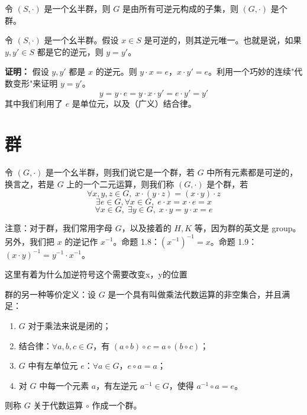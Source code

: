 \begin{lemma}[引理 1.1：幺半群的逆元构成群]
令 $(S,\cdot)$ 是一个幺半群，则 $G$ 是由所有可逆元构成的子集，则 $(G,\cdot)$ 是个群。
\end{lemma}

\begin{proposition}[命题 1.7：逆元唯一]
令 $(S,\cdot)$ 是一个幺半群。假设 $x\in S$ 是可逆的，则其逆元唯一。也就是说，如果 $y,y'\in S$ 都是它的逆元，则 $y=y'$。

\textbf{证明：} 假设 $y,y'$ 都是 $x$ 的逆元。则 $y\cdot x=e$，$x\cdot y'=e$。利用一个巧妙的连续"代数变形"来证明 $y=y'$。
\[
y=y\cdot e=y\cdot x\cdot y'=e\cdot y'=y'
\]
其中我们利用了 $e$ 是单位元，以及（广义）结合律。
\end{proposition}

\section{群}

\begin{definition}[群（定义 1.9）]
令 $(G,\cdot)$ 是一个幺半群，则我们说它是一个群，若 $G$ 中所有元素都是可逆的，换言之，若是 $G$ 上的一个二元运算，则我们称 $(G,\cdot)$ 是个群，若
\[
\forall x,y,z\in G,\;x\cdot(y\cdot z)=(x\cdot y)\cdot z
\]
\[
\exists e\in G,\forall x\in G,\;e\cdot x=x\cdot e=x
\]
\[
\forall x\in G,\;\exists y\in G,\;x\cdot y=y\cdot x=e
\]

注意：对于群，我们常用字母 $G$，以及接着的 $H,K$ 等，因为群的英文是 group。另外，我们把 $x$ 的逆记作 $x^{-1}$。命题 1.8：$(x^{-1})^{-1}=x$。命题 1.9：$(x\cdot y)^{-1}=y^{-1}\cdot x^{-1}$。
\end{definition}

\begin{note}[定义1 9幺半群加逆元就是群]
这里有着为什么加逆符号这个需要改变x，y的位置
\end{note}

\begin{note}
群的另一种等价定义：设 $G$ 是一个具有叫做乘法代数运算的非空集合，并且满足：
\begin{enumerate}
  \item[I.] $G$ 对于乘法来说是闭的；
  \item[II.] 结合律：$\forall a,b,c\in G$，有 $(a\circ b)\circ c=a\circ(b\circ c)$；
  \item[III.] $G$ 中有左单位元 $e$：$\forall a\in G$，$e\circ a=a$；
  \item[IV.] 对 $G$ 中每一个元素 $a$，有左逆元 $a^{-1}\in G$，使得 $a^{-1}\circ a=e$。
\end{enumerate}
则称 $G$ 关于代数运算 $\circ$ 作成一个群。
\end{note}

